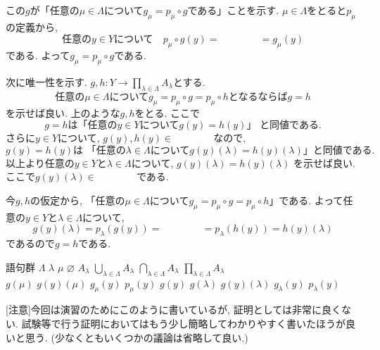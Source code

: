 \documentclass[dvipdfmx,a4paper,11pt]{article}
\theoremstyle{definition}
\begin{document}
この$g$が「任意の$\mu \in \Lambda$について$g_{\mu} = p_{\mu} \circ g $である」ことを示す.
$\mu \in \Lambda$をとると$ p_{\mu} $の定義から,
$$
\text{任意の$y\in Y$について}
\quad
 p_{\mu} \circ g(y)
 =
\boxed{\phantom{hogehoge}}
=
g_{\mu}(y)
$$
である. 
よって$g_{\mu} = p_{\mu} \circ g$である. 

次に唯一性を示す.
$g, h : Y \rightarrow \prod_{\lambda \in \Lambda} A_{\lambda}$とする. 
$$
\text{任意の$\mu \in \Lambda$について$g_{\mu} = p_{\mu} \circ g = p_{\mu} \circ h$
となるならば$g=h$}
$$
を示せば良い. 
上のような$g,h$をとる. 
ここで
$$
\text{$g=h$は「任意の$y \in Y$について$g(y) = h(y)$」
と同値である.}
$$
さらに$y \in Y$について, $g(y), h(y) \in \boxed{\phantom{hogehoge}}$なので, 
$$
\text{$g(y)=h(y)$は
「任意の$\lambda \in \Lambda$について
$g(y)(\lambda)=h(y)(\lambda)$」と同値である.}
$$
以上より任意の$y \in Y$と$\lambda \in \Lambda$について, 
$
g(y)(\lambda)=h(y)(\lambda)
$
を示せば良い. 
ここで$g(y)(\lambda) \in \boxed{\phantom{hogehoge}}$である. 

今$g,h$の仮定から, 「任意の$\mu \in \Lambda$について$g_{\mu} = p_{\mu} \circ g = p_{\mu} \circ h$」である. 
よって任意の$y \in Y$と$\lambda \in \Lambda$について, 
$$
g(y)(\lambda)
=
p_{\lambda}(g(y))
=
\boxed{\phantom{hogehoge}}
=
p_{\lambda}(h(y))
=
h(y)(\lambda)
$$
であるので$g=h$である. 


 \begin{itembox}[l]{語句群}
$\Lambda$
\quad $\lambda$
\quad $\mu$
\quad $\varnothing$
\quad $A_\lambda$
\quad $\bigcup_{\lambda \in \Lambda}A_{\lambda}$
\quad $\bigcap_{\lambda \in \Lambda}A_{\lambda}$
\quad $\prod_{\lambda \in \Lambda} A_{\lambda}$
 \\
$g(\mu)$
\quad $g(y)(\mu)$
\quad $g_{\mu}(y)$
\quad $p_{\mu}(y)$
\quad $g(y)$
\quad $g(\lambda)$
\quad $g(y)(\lambda)$
\quad $g_{\lambda}(y)$
\quad $p_{\lambda}(y)$
\end{itembox}

[注意]今回は演習のためにこのように書いているが, 証明としては非常に良くない. 
試験等で行う証明においてはもう少し簡略してわかりやすく書いたほうが良いと思う. (少なくともいくつかの議論は省略して良い.)
\end{document}
